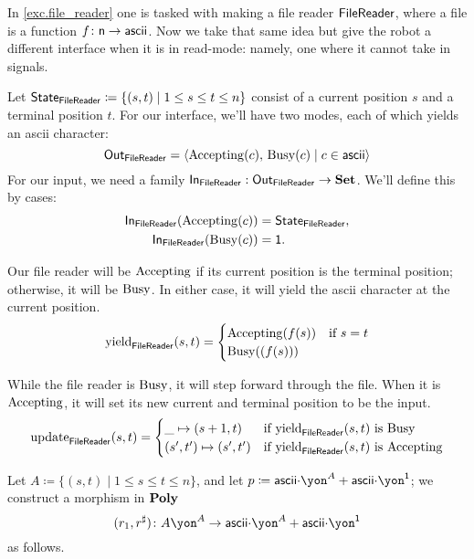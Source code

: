 \documentclass[Book-Poly]{subfiles}
\begin{document}
\begin{example}\label{ex.generalized_file_reader}
In \cref{exc.file_reader} one is tasked with making a file reader $\mathsf{FileReader}$, where a file is a function $f\colon\mathsf{n}\to\mathsf{ascii}$. Now we take that same idea but give the robot a different interface when it is in read-mode: namely, one where it cannot take in signals.

Let $\mathsf{State}_{\mathsf{FileReader}} \coloneqq \{(s,t)\mid 1\leq s\leq t\leq n\}$ consist of a
current position $s$ and a terminal position $t$. For our interface, we'll have
two modes, each of which yields an ascii character:
\[\mathsf{Out}_{\mathsf{FileReader}} = \langle \mathrm{Accepting}(c),\, \mathrm{Busy}(c) \mid c \in \mathsf{ascii} \rangle
\]
For our input, we need a family $\mathsf{In}_{\mathsf{FileReader}} : \mathsf{Out}_{\mathsf{FileReader}} \to \mathbf{Set}$.
We'll define this by cases:
\begin{align*}
  \mathsf{In}_{\mathsf{FileReader}}(\mathrm{Accepting}(c)) &= \mathsf{State}_{\mathsf{FileReader}}, \\
  \mathsf{In}_{\mathsf{FileReader}}(\mathrm{Busy}(c)) &= \mathsf{1}.
\end{align*}

Our file reader will be $\mathrm{Accepting}$ if its current position is the
terminal position; otherwise, it will be $\mathrm{Busy}$. In either case, it will
yield the ascii character at the current position.
\begin{align*}
  \mathrm{yield}_{\mathsf{FileReader}}(s, t) = \begin{cases} \mathrm{Accepting}(f(s)) &\mbox{if $s = t$}\\ \mathrm{Busy}((f(s)))  \end{cases}
\end{align*}

While the file reader is $\mathrm{Busy}$, it will step forward through the file.
When it is $\mathrm{Accepting}$, it will set its new current and terminal position
to be the input. 
\begin{align*}
  \mathrm{update}_{\mathsf{FileReader}}(s, t) = \begin{cases} \_ \mapsto (s + 1, t) &\mbox{if $\mathrm{yield}_{\mathsf{FileReader}}(s, t)$ is $\mathrm{Busy}$} \\ (s', t') \mapsto (s', t') &\mbox{if $\mathrm{yield}_{\mathsf{FileReader}}(s, t)$ is $\mathrm{Accepting}$}  \end{cases}
\end{align*}

Let $A\coloneqq\{(s,t)\mid 1\leq s\leq t\leq n\}$, and let $p\coloneqq \Set{ascii}\mdot\yon^A+\Set{ascii}\mdot\yon^\1$; we construct a morphism in $\mathbf{Poly}$
\[
(r_1,r^\sharp)\colon A\yon^A\to \Set{ascii}\mdot\yon^A+\Set{ascii}\mdot\yon^\1
\]
as follows.


\end{example}
\end{document}
